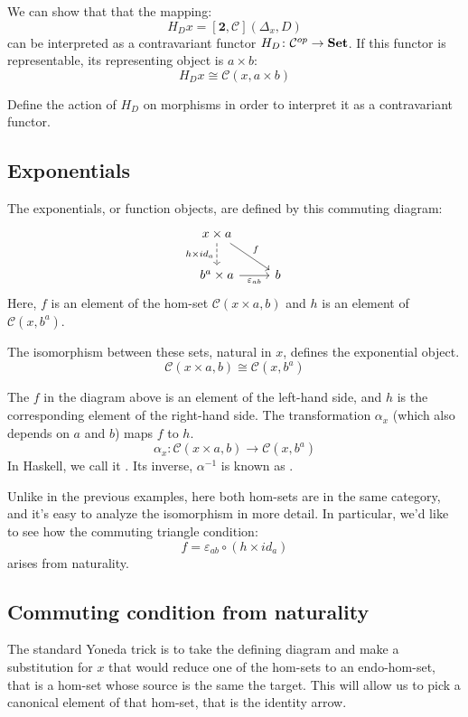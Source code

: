 \documentclass[DaoFP]{subfiles}
\begin{document}
We can show that that the mapping:
\[ H_D x = [\mathbf{2}, \mathcal{C}](\Delta_x, D) \]
can be interpreted as a contravariant functor $H_D \colon \mathcal{C}^{op} \to \mathbf{Set}$. If this functor is representable, its representing object is $a \times b$:
\[ H_D x \cong \mathcal{C}(x, a \times b) \]


\begin{exercise}
Define the action of $H_D$ on morphisms in order to interpret it as a contravariant functor.
\end{exercise}

\subsection{Exponentials}

The exponentials, or function objects, are defined by this commuting diagram:
\[
 \begin{tikzcd}
 x \times a
 \arrow[d, dashed, "h \times id_a"']
 \arrow[rd, "f"]
 \\
 b^a \times a
 \arrow[r, "\varepsilon_{a b}"']
& b
 \end{tikzcd}
\]
Here, $f$ is an element of the hom-set $\mathcal{C}(x \times a, b)$ and $h$ is an element of $\mathcal{C}(x, b^a)$. 

The isomorphism between these sets, natural in $x$, defines the exponential object. 
\[\mathcal{C}(x \times a, b) \cong \mathcal{C}(x, b^a)\]

The $f$ in the diagram above is an element of the left-hand side, and $h$ is the corresponding element of the right-hand side. The transformation $\alpha_x$ (which also depends on $a$ and $b$) maps $f$ to $h$.
\[ \alpha_x \colon \mathcal{C}(x \times a, b) \to \mathcal{C}(x, b^a) \]
In Haskell, we call it . Its inverse, $\alpha^{-1}$ is known as .

Unlike in the previous examples, here both hom-sets are in the same category, and it's easy to analyze the isomorphism in more detail. In particular, we'd like to see how the commuting triangle condition:
\[  f = \varepsilon_{a b} \circ (h \times id_a) \]
arises from naturality.

\subsection{Commuting condition from naturality}

The standard Yoneda trick is to take the defining diagram and make a substitution for $x$ that would reduce one of the hom-sets to an endo-hom-set, that is a hom-set whose source is the same the target. This will allow us to pick a canonical element of that hom-set, that is the identity arrow.
\end{document}
